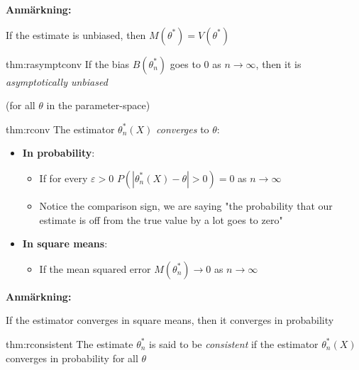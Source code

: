 \par\bigskip
\noindent\textbf{Anmärkning:}\par
\noindent If the estimate is unbiased, then $M(\theta^*) = V(\theta^*)$ 
\par\bigskip
\begin{theo}{thm:rasymptconv}
  If the bias $B(\theta_n^*)$ goes to 0 as $n\to\infty$, then it is \textit{asymptotically unbiased}
  \par\bigskip
  \noindent (for all $\theta$ in the parameter-space)
\end{theo}
\par\bigskip
\begin{theo}{thm:rconv}
  The estimator $\theta_n^*(X)$ \textit{converges} to $\theta$:\par
  \begin{itemize}
    \item\textbf{In probability}:\par
      \begin{itemize}
        \item If for every $\varepsilon>0$ $P(\left|\theta_n^*(X)-\theta\right|>0) = 0$ as $n\to\infty$\par
        \item Notice the comparison sign, we are saying "the probability that our estimate is off from the true value by a lot goes to zero"
      \end{itemize}\par
    \item\textbf{In square means}:\par
      \begin{itemize}
        \item If the mean squared error $M(\theta_n^*)\to0$ as $n\to\infty$
      \end{itemize}
  \end{itemize}
\end{theo}
\par\bigskip
\noindent\textbf{Anmärkning:}\par
\noindent If the estimator converges in square means, then it converges in probability
\par\bigskip
\begin{theo}[Consistent]{thm:rconsistent}
  The estimate $\theta_n^*$ is said to be \textit{consistent} if the estimator $\theta_n^*(X)$ converges in probability for all $\theta$
\end{theo}
